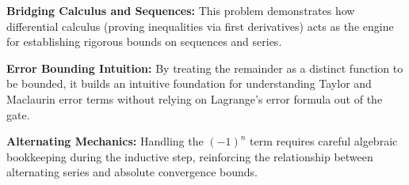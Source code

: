 \begin{takeaways}
\item \textbf{Bridging Calculus and Sequences:} This problem demonstrates how differential calculus (proving inequalities via first derivatives) acts as the engine for establishing rigorous bounds on sequences and series.
\item \textbf{Error Bounding Intuition:} By treating the remainder as a distinct function to be bounded, it builds an intuitive foundation for understanding Taylor and Maclaurin error terms without relying on Lagrange's error formula out of the gate.
\item \textbf{Alternating Mechanics:} Handling the $(-1)^n$ term requires careful algebraic bookkeeping during the inductive step, reinforcing the relationship between alternating series and absolute convergence bounds.
\end{takeaways}
